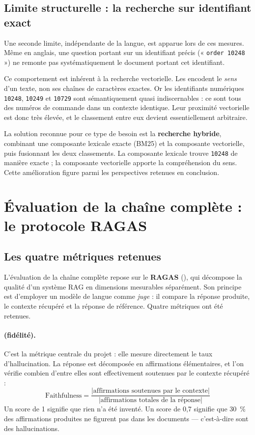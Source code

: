 \subsection{Limite structurelle : la recherche sur identifiant exact}

Une seconde limite, indépendante de la langue, est apparue lors de ces mesures.
Même en anglais, une question portant sur un identifiant précis
(« \texttt{order 10248} ») ne remonte pas systématiquement le document portant
cet identifiant.

Ce comportement est inhérent à la recherche vectorielle. Les
 encodent le \emph{sens} d'un texte, non ses chaînes de
caractères exactes. Or les identifiants numériques \texttt{10248},
\texttt{10249} et \texttt{10729} sont sémantiquement quasi indiscernables : ce
sont tous des numéros de commande dans un contexte identique. Leur proximité
vectorielle est donc très élevée, et le classement entre eux devient
essentiellement arbitraire.

La solution reconnue pour ce type de besoin est la \textbf{recherche hybride},
combinant une composante lexicale exacte (BM25) et la composante vectorielle,
puis fusionnant les deux classements. La composante lexicale trouve
\texttt{10248} de manière exacte ; la composante vectorielle apporte la
compréhension du sens. Cette amélioration figure parmi les perspectives
retenues en conclusion.

\section{Évaluation de la chaîne complète : le protocole RAGAS}

\subsection{Les quatre métriques retenues}

L'évaluation de la chaîne complète repose sur le 
\textbf{RAGAS} (), qui décompose
la qualité d'un système RAG en dimensions mesurables séparément. Son principe
est d'employer un modèle de langue comme \emph{juge} : il compare la réponse
produite, le contexte récupéré et la réponse de référence. Quatre métriques ont
été retenues.

\paragraph{ (fidélité).}
C'est la métrique centrale du projet : elle mesure directement le taux
d'hallucination. La réponse est décomposée en affirmations élémentaires, et l'on
vérifie combien d'entre elles sont effectivement soutenues par le contexte
récupéré :
\[
  \text{Faithfulness} =
  \frac{\lvert\text{affirmations soutenues par le contexte}\rvert}
       {\lvert\text{affirmations totales de la réponse}\rvert}
\]
Un score de 1 signifie que rien n'a été inventé. Un score de 0,7 signifie que
30~\% des affirmations produites ne figurent pas dans les documents --- c'est-à-dire
sont des hallucinations.

